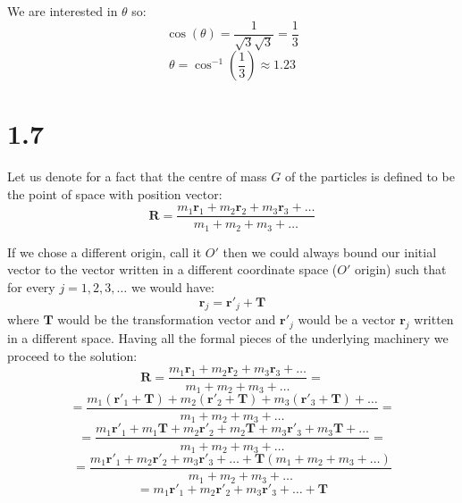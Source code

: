 \documentclass{article}
\begin{document}
We are interested in \(\theta\) so:
\begin{equation*}
    \cos(\theta) = \frac{1}{\sqrt{3}\sqrt{3}} = \frac{1}{3}
\end{equation*}
\begin{equation*}
    \theta = \cos^{-1}(\frac{1}{3}) \approx 1.23
\end{equation*}

\section*{1.7}


Let us denote for a fact that the centre of mass \(G\) of the particles is defined to be the point of space
with position vector:
\begin{equation*}
    \textbf{R} = \frac{m_{1}\textbf{r}_{1} + m_{2}\textbf{r}_{2} + m_{3}\textbf{r}_{3} + \dots}{m_1 + m_2 + m_3 + \dots}
\end{equation*}

If we chose a different origin, call it \(O'\) then we could always bound our initial vector to
the vector written in a different coordinate space (\(O'\) origin) such that for every
\(j = 1, 2, 3, \dots\) we would have:
\begin{equation*}
    \textbf{r}_j = \textbf{r}'_{j} + \textbf{T}
\end{equation*} 
where \(\textbf{T}\) would be the transformation vector and \(\textbf{r}'_{j}\) would be
a vector \(\textbf{r}_j\) written in a different space. Having all the formal pieces of
the underlying machinery we proceed to the solution:
\begin{equation*}
    \textbf{R} = \frac{m_{1}\textbf{r}_{1} + m_{2}\textbf{r}_{2} + m_{3}\textbf{r}_{3} + \dots}{m_1 + m_2 + m_3 + \dots} =
\end{equation*} 
\begin{equation*}
    = \frac{m_{1}(\textbf{r}'_{1} + \textbf{T}) + m_{2}(\textbf{r}'_{2} + \textbf{T}) + m_{3}(\textbf{r}'_{3} + \textbf{T}) + \dots}{{m_1 + m_2 + m_3 + \dots}} =
\end{equation*}
\begin{equation*}
    = \frac{m_{1}\textbf{r}'_{1} + m_{1}\textbf{T} + m_{2}\textbf{r}'_{2} + m_{2}\textbf{T} + m_{3}\textbf{r}'_{3} + m_{3}\textbf{T} + \dots}{{m_1 + m_2 + m_3 + \dots}} =
\end{equation*}
\begin{equation*}
    = \frac{m_{1}\textbf{r}'_{1} + m_{2}\textbf{r}'_{2} + m_{3}\textbf{r}'_{3} + \dots + \textbf{T}(m_1 + m_2 + m_3 + \dots)}{m_1 + m_2 + m_3 + \dots}
\end{equation*}
\begin{equation*}
    = m_{1}\textbf{r}'_{1} + m_{2}\textbf{r}'_{2} + m_{3}\textbf{r}'_{3} + \dots + \textbf{T}
\end{equation*}
\end{document}
